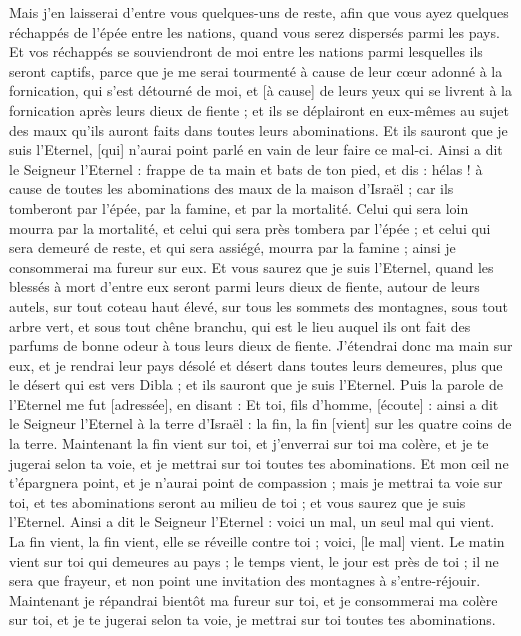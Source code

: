 \begin{multicols}{2}
Mais j'en laisserai d'entre vous quelques-uns de reste, afin que vous ayez quelques réchappés de l'épée entre les nations, quand vous serez dispersés parmi les pays.
Et vos réchappés se souviendront de moi entre les nations parmi lesquelles ils seront captifs, parce que je me serai tourmenté à cause de leur cœur adonné à la fornication, qui s'est détourné de moi, et [à cause] de leurs yeux qui se livrent à la fornication après leurs dieux de fiente ; et ils se déplairont en eux-mêmes au sujet des maux qu'ils auront faits dans toutes leurs abominations.
Et ils sauront que je suis l'Eternel, [qui] n'aurai point parlé en vain de leur faire ce mal-ci.
Ainsi a dit le Seigneur l'Eternel : frappe de ta main et bats de ton pied, et dis : hélas ! à cause de toutes les abominations des maux de la maison d'Israël ; car ils tomberont par l'épée, par la famine, et par la mortalité.
Celui qui sera loin mourra par la mortalité, et celui qui sera près tombera par l'épée ; et celui qui sera demeuré de reste, et qui sera assiégé, mourra par la famine ; ainsi je consommerai ma fureur sur eux.
Et vous saurez que je suis l'Eternel, quand les blessés à mort d'entre eux seront parmi leurs dieux de fiente, autour de leurs autels, sur tout coteau haut élevé, sur tous les sommets des montagnes, sous tout arbre vert, et sous tout chêne branchu, qui est le lieu auquel ils ont fait des parfums de bonne odeur à tous leurs dieux de fiente.
J'étendrai donc ma main sur eux, et je rendrai leur pays désolé et désert dans toutes leurs demeures, plus que le désert qui est vers Dibla ; et ils sauront que je suis l'Eternel.
\VerseOne{}Puis la parole de l'Eternel me fut [adressée], en disant :
Et toi, fils d'homme, [écoute] : ainsi a dit le Seigneur l'Eternel à la terre d'Israël : la fin, la fin [vient] sur les quatre coins de la terre.
Maintenant la fin vient sur toi, et j'enverrai sur toi ma colère, et je te jugerai selon ta voie, et je mettrai sur toi toutes tes abominations.
Et mon œil ne t'épargnera point, et je n'aurai point de compassion ; mais je mettrai ta voie sur toi, et tes abominations seront au milieu de toi ; et vous saurez que je suis l'Eternel.
Ainsi a dit le Seigneur l'Eternel : voici un mal, un seul mal qui vient.
La fin vient, la fin vient, elle se réveille contre toi ; voici, [le mal] vient.
Le matin vient sur toi qui demeures au pays ; le temps vient, le jour est près de toi ; il ne sera que frayeur, et non point une invitation des montagnes à s'entre-réjouir.
Maintenant je répandrai bientôt ma fureur sur toi, et je consommerai ma colère sur toi, et je te jugerai selon ta voie, je mettrai sur toi toutes tes abominations.

\end{multicols}
